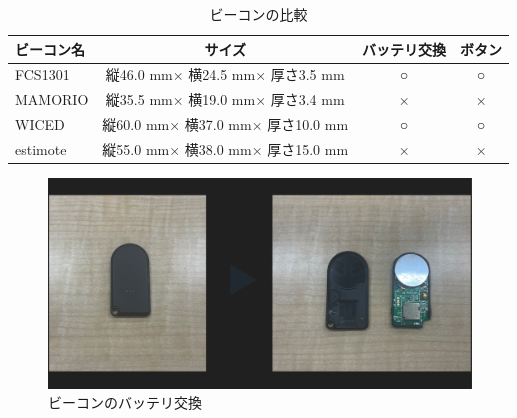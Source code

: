 \begin{table}[H]
  \begin{center}
    \caption{ビーコンの比較}
    \label{tb:beacons}
    \begin{tabular}{|l|c|c|c|} \hline
      ビーコン名 & サイズ                            & バッテリ交換 & ボタン \\ \hline \hline
      FCS1301    & 縦46.0 mm× 横24.5 mm× 厚さ3.5 mm  & ○            & ○      \\
      MAMORIO    & 縦35.5 mm× 横19.0 mm× 厚さ3.4 mm  & ×            & ×      \\
      WICED      & 縦60.0 mm× 横37.0 mm× 厚さ10.0 mm & ○            & ○      \\
      estimote   & 縦55.0 mm× 横38.0 mm× 厚さ15.0 mm & ×            & ×      \\\hline
    \end{tabular}
  \end{center}
\end{table}


\begin{figure}[H]
  \begin{center}
    \includegraphics[width=150mm]{image/batchange.png}
    \caption{ビーコンのバッテリ交換}
    \label{fig:batchange}
  \end{center}
\end{figure}

